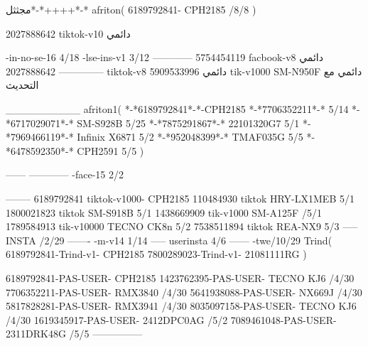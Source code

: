 مجثثل*-*++++*-*
afriton(
6189792841- CPH2185  /8/8
)

2027888642 tiktok-v10
دائمي

-in-no-se-16 4/18
-lse-ins-v1 3/12
------------
5754454119 facbook-v8
دائمي
--------------
2027888642 tiktok-v8
دائمي
5909533996 tik-v1000  SM-N950F
دائمي مع التحديث

__________
afriton1(
*-*6189792841*-*-CPH2185
*-*7706352211*-* 5/14
*-*6717029071*-*  SM-S928B 5/25
*-*7875291867*-* 22101320G7 5/1
*-*7969466119*-* Infinix X6871 5/2
*-*952048399*-* TMAF035G 5/5
*-*6478592350*-* CPH2591 5/5
)


------
------------
-face-15 2/2

--------
6189792841 tiktok-v1000- CPH2185 
110484930 tiktok HRY-LX1MEB  5/1
1800021823 tiktok SM-S918B  5/1
1438669909 tik-v1000 SM-A125F /5/1
1789584913 tik-v10000  TECNO CK8n 5/2
7538511894 tiktok REA-NX9  5/3
-----
 INSTA /2/29
-------
-m-v14 1/14
-----
userinsta 4/6
------
-twe/10/29
Trind(
6189792841-Trind-v1- CPH2185 
7800289023-Trind-v1- 21081111RG \5\5
)

6189792841-PAS-USER- CPH2185 
1423762395-PAS-USER- TECNO KJ6 /4/30
7706352211-PAS-USER- RMX3840 /4/30
5641938088-PAS-USER- NX669J /4/30
5817828281-PAS-USER- RMX3941 /4/30
8035097158-PAS-USER- TECNO KJ6 /4/30
1619345917-PAS-USER- 2412DPC0AG /5/2
7089461048-PAS-USER- 2311DRK48G /5/5
    ---------------

